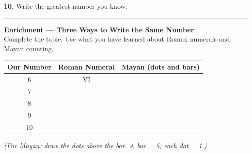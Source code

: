 \documentclass[12pt, letterpaper]{article}
\newcommand{\answerline}{\underline{\hspace{2.5cm}}}
\begin{document}
\bigskip
\noindent\textbf{10.} Write the greatest number you know. \hfill \answerline

\bigskip
\noindent\textcolor{scholared}{\rule{\linewidth}{0.4pt}}

\begin{mayanbox}
\textcolor{mayared}{\textbf{Enrichment — Three Ways to Write the Same Number}}\\[6pt]
\noindent Complete the table. Use what you have learned about Roman numerals and Mayan counting.\\[8pt]
\begin{center}
\renewcommand{\arraystretch}{2.0}
\begin{tabular}{|c|c|c|}
\hline
\textbf{Our Number} & \textbf{Roman Numeral} & \textbf{Mayan (dots and bars)} \\
\hline
6  & VI & \phantom{MMMM} \\
\hline
7  & \phantom{VIII} & \phantom{MMMM} \\
\hline
8  & \phantom{VIII} & \phantom{MMMM} \\
\hline
9  & \phantom{VIII} & \phantom{MMMM} \\
\hline
10 & \phantom{VIII} & \phantom{MMMM} \\
\hline
\end{tabular}
\end{center}
\medskip
\noindent\textit{(For Mayan: draw the dots above the bar. A bar = 5; each dot = 1.)}
\end{mayanbox}
\end{document}
